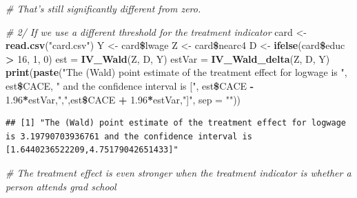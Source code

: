 \documentclass[]{article}
\newenvironment{Shaded}{\begin{snugshade}}{\end{snugshade}}
\newcommand{\KeywordTok}[1]{\textcolor[rgb]{0.13,0.29,0.53}{\textbf{#1}}}
\newcommand{\DataTypeTok}[1]{\textcolor[rgb]{0.13,0.29,0.53}{#1}}
\newcommand{\DecValTok}[1]{\textcolor[rgb]{0.00,0.00,0.81}{#1}}
\newcommand{\FloatTok}[1]{\textcolor[rgb]{0.00,0.00,0.81}{#1}}
\newcommand{\StringTok}[1]{\textcolor[rgb]{0.31,0.60,0.02}{#1}}
\newcommand{\CommentTok}[1]{\textcolor[rgb]{0.56,0.35,0.01}{\textit{#1}}}
\newcommand{\OperatorTok}[1]{\textcolor[rgb]{0.81,0.36,0.00}{\textbf{#1}}}
\newcommand{\NormalTok}[1]{#1}
\begin{document}
\begin{Shaded}
\begin{Highlighting}[]
\CommentTok{# That's still significantly different from zero.}
\end{Highlighting}
\end{Shaded}

\begin{Shaded}
\begin{Highlighting}[]
\CommentTok{# 2/ If we use a different threshold for the treatment indicator}
\NormalTok{card <-}\StringTok{ }\KeywordTok{read.csv}\NormalTok{(}\StringTok{"card.csv"}\NormalTok{)}
\NormalTok{Y <-}\StringTok{ }\NormalTok{card}\OperatorTok{\$}\NormalTok{lwage}
\NormalTok{Z <-}\StringTok{ }\NormalTok{card}\OperatorTok{\$}\NormalTok{nearc4}
\NormalTok{D <-}\StringTok{ }\KeywordTok{ifelse}\NormalTok{(card}\OperatorTok{\$}\NormalTok{educ }\OperatorTok{>}\StringTok{ }\DecValTok{16}\NormalTok{, }\DecValTok{1}\NormalTok{, }\DecValTok{0}\NormalTok{)}
\NormalTok{est =}\StringTok{ }\KeywordTok{IV_Wald}\NormalTok{(Z, D, Y)}
\NormalTok{estVar =}\StringTok{ }\KeywordTok{IV_Wald_delta}\NormalTok{(Z, D, Y)}
\KeywordTok{print}\NormalTok{(}\KeywordTok{paste}\NormalTok{(}\StringTok{"The (Wald) point estimate of the treatment effect for logwage is "}\NormalTok{, est}\OperatorTok{\$}\NormalTok{CACE, }\StringTok{" and the confidence interval is ["}\NormalTok{, est}\OperatorTok{\$}\NormalTok{CACE }\OperatorTok{-}\StringTok{ }\FloatTok{1.96}\OperatorTok{*}\NormalTok{estVar,}\StringTok{","}\NormalTok{,est}\OperatorTok{\$}\NormalTok{CACE }\OperatorTok{+}\StringTok{ }\FloatTok{1.96}\OperatorTok{*}\NormalTok{estVar,}\StringTok{"]"}\NormalTok{, }\DataTypeTok{sep =} \StringTok{""}\NormalTok{))}
\end{Highlighting}
\end{Shaded}

\begin{verbatim}
## [1] "The (Wald) point estimate of the treatment effect for logwage is 3.19790703936761 and the confidence interval is [1.6440236522209,4.75179042651433]"
\end{verbatim}

\begin{Shaded}
\begin{Highlighting}[]
\CommentTok{# The treatment effect is even stronger when the treatment indicator is whether a person attends grad school}
\end{Highlighting}
\end{Shaded}
\end{document}
